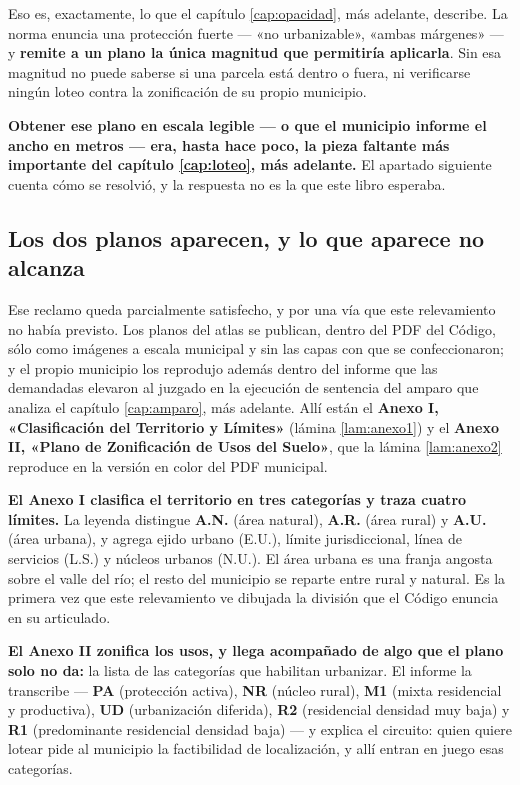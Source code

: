 \begin{cautela}
Eso es, exactamente, lo que el capítulo \ref{cap:opacidad}, más adelante, describe. La norma enuncia una protección fuerte ---
«no urbanizable», «ambas márgenes» --- y \textbf{remite a un plano la única magnitud que
permitiría aplicarla}. Sin esa magnitud no puede saberse si una parcela está dentro o fuera, ni
verificarse ningún loteo contra la zonificación de su propio municipio.

\textbf{Obtener ese plano en escala legible --- o que el municipio informe el ancho en metros --- era, hasta hace poco, la pieza faltante más importante del capítulo \ref{cap:loteo}, más adelante.} El apartado siguiente cuenta cómo se resolvió, y la respuesta no es la que este libro esperaba.
\end{cautela}

\subsection*{Los dos planos aparecen, y lo que aparece no alcanza}

Ese reclamo queda parcialmente satisfecho, y por una vía que este relevamiento no había
previsto. Los planos del atlas se publican, dentro del PDF del Código, sólo como imágenes a escala municipal y sin las capas con que se confeccionaron; y el propio municipio los reprodujo además dentro del informe que las demandadas elevaron al juzgado en la ejecución de sentencia del
amparo que analiza el capítulo \ref{cap:amparo}, más adelante. Allí están el \textbf{Anexo I, «Clasificación del
Territorio y Límites»} (lámina \ref{lam:anexo1}) y el \textbf{Anexo II, «Plano de Zonificación
de Usos del Suelo»}, que la lámina \ref{lam:anexo2} reproduce en la versión en color del PDF municipal.

\textbf{El Anexo I clasifica el territorio en tres categorías y traza cuatro límites.} La
leyenda distingue \textbf{A.N.} (área natural), \textbf{A.R.} (área rural) y \textbf{A.U.}
(área urbana), y agrega ejido urbano (E.U.), límite jurisdiccional, línea de servicios (L.S.)
y núcleos urbanos (N.U.). El área urbana es una franja angosta sobre el valle del río; el
resto del municipio se reparte entre rural y natural. Es la primera vez que este relevamiento
ve dibujada la división que el Código enuncia en su articulado.

\textbf{El Anexo II zonifica los usos, y llega acompañado de algo que el plano solo no da:} la
lista de las categorías que habilitan urbanizar. El informe la transcribe ---
\textbf{PA} (protección activa), \textbf{NR} (núcleo rural), \textbf{M1} (mixta residencial y
productiva), \textbf{UD} (urbanización diferida), \textbf{R2} (residencial densidad muy baja) y
\textbf{R1} (predominante residencial densidad baja) --- y explica el circuito: quien quiere
lotear pide al municipio la factibilidad de localización, y allí entran en juego esas
categorías.

